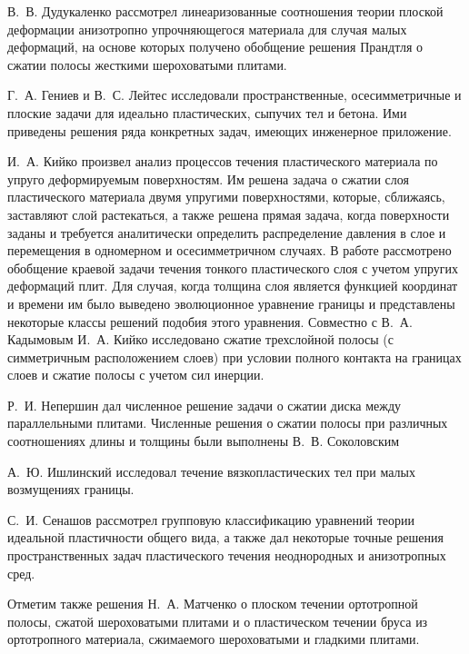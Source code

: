 В.~В. Дудукаленко \autocite{Dudukalenko:1963} рассмотрел линеаризованные соотношения теории плоской деформации анизотропно упрочняющегося материала для случая малых деформаций, на основе которых получено обобщение решения Прандтля о сжатии полосы жесткими шероховатыми плитами.

Г.~А. Гениев и В.~С. Лейтес \autocite{Geniev:1981} исследовали пространственные, осесимметричные и плоские задачи для идеально пластических, сыпучих тел и бетона. Ими приведены решения ряда конкретных задач, имеющих инженерное приложение.

И.~А. Кийко \autocite{Kiyko:1961,Kiyko:1963,Kiyko:1964} произвел анализ процессов течения пластического материала по упруго деформируемым поверхностям. Им решена задача о сжатии слоя пластического материала двумя упругими поверхностями, которые, сближаясь, заставляют слой растекаться, а также решена прямая задача, когда поверхности заданы и требуется аналитически определить распределение давления в слое и перемещения в одномерном и осесимметричном случаях. В работе \autocite{Kiyko:1978} рассмотрено обобщение краевой задачи течения тонкого пластического слоя с учетом упругих деформаций плит.
Для случая, когда толщина слоя является функцией координат и времени им \autocite{Kiyko:1985} было выведено эволюционное уравнение границы и представлены некоторые
классы решений подобия этого уравнения.
Совместно с В.~А. Кадымовым \autocite{Kiyko:2003} И.~А. Кийко исследовано сжатие трехслойной полосы (с симметричным расположением слоев) при условии полного контакта на границах слоев и сжатие полосы с учетом сил инерции.

Р.~И. Непершин \autocite{Nepershin:1968} дал численное решение задачи о сжатии диска между параллельными плитами.
Численные решения о сжатии полосы при различных соотношениях длины и толщины были выполнены В.~В. Соколовским \autocite{Sokolovskiy:1969}

А.~Ю. Ишлинский \autocite{Ishlinsky:1943a,Ishlinsky:1943b} исследовал течение вязкопластических тел при малых возмущениях границы.

С.~И. Сенашов \autocite{Senashov:1977,Senashov:1978,Senashov:1979,Senashov:1980a,Senashov:1980b,Senashov:1984a,Senashov:1984b} рассмотрел групповую классификацию уравнений теории идеальной пластичности общего вида, а также дал некоторые точные решения пространственных задач пластического течения неоднородных и анизотропных сред.

Отметим также решения Н.~А. Матченко \autocite{Matchenko:1973,Matchenko:1974} о плоском течении ортотропной полосы, сжатой шероховатыми плитами и о пластическом течении бруса из ортотропного материала, сжимаемого шероховатыми и гладкими плитами.

